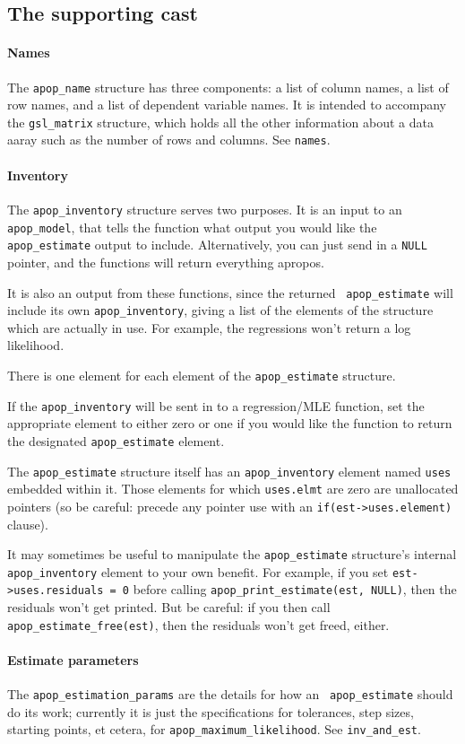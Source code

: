 \subsection{The supporting cast}
\paragraph{Names}
The {\tt apop\_name} structure has three components: a list of column
names, a list of row names, and a list of dependent variable names. It
is intended to accompany the {\tt gsl\_matrix} structure, which holds
all the other information about a data aaray such as the number of rows
and columns.  See {\tt names}.

\paragraph{Inventory}
The {\tt apop\_inventory} structure serves two purposes. It is an input
to an {\tt apop\_\-model}, that tells the function what output you
would like the {\tt apop\_\-estimate} output to include.  Alternatively, you
can just send in a {\tt NULL} pointer, and the functions will return
everything apropos.

It is also an output from these functions, since the returned {\tt
apop\_\-estimate} will include its own {\tt apop\_\-in\-ventory},
giving a list of the elements of the structure which are
actually in use. For example, the regressions won't return a log
likelihood.

There is one element for each element of the {\tt apop\_estimate} structure.

If the {\tt apop\_inventory} will be sent in to a regression/MLE
function, set the appropriate element to either zero or one if you would
like the function to return the designated {\tt apop\_estimate} element.

The {\tt apop\_estimate} structure itself has an {\tt apop\_inventory}
element named {\tt uses} embedded within it. Those elements for
which {\tt uses.elmt} are zero are unallocated pointers (so be careful:
precede any pointer use with an {\tt if(est->uses.element)} clause).

It may sometimes be useful to manipulate the {\tt apop\_estimate} structure's
internal {\tt apop\_\-inventory} element to your own benefit. For
example, if you set {\tt est->uses.residuals = 0} before calling
{\tt apop\_\-print\_\-estimate(est, NULL)}, then the residuals won't get
printed. But be careful: if you then call {\tt apop\_\-estimate\_\-free(est)},
then the residuals won't get freed, either.

\paragraph{Estimate parameters}
The {\tt apop\_estimation\_params} are the details for how an {\tt
apop\_estimate} should do its work; currently it is just the specifications
for tolerances, step sizes, starting points, et cetera, for {\tt apop\_max\-i\-mum\_like\-li\-hood}.
 See {\tt inv\_and\_est}.
